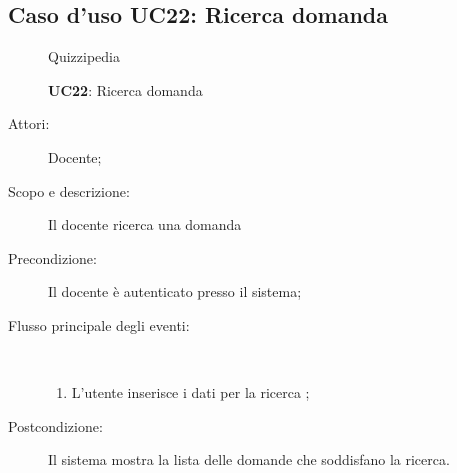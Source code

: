 \subsection{Caso d'uso UC22: Ricerca domanda}
	\begin{figure}[H]
		\centering
		\begin{resizedtikzpicture}{\textwidth}
		\begin{umlsystem}[x=0, fill=lightgray!20]{Quizzipedia}
		\end{umlsystem}
		\end{resizedtikzpicture}
		\caption{\textbf{UC22}: Ricerca domanda}
		\label{UC22}
	\end{figure}
\begin{description}
\item[Attori:] Docente;
\item[Scopo e descrizione:] Il docente ricerca una domanda
      \item[Precondizione:] Il docente è autenticato presso il sistema;

        \item[Flusso principale degli eventi:] \ 
 \begin{enumerate}
          \item L'utente inserisce i dati per la ricerca	;

      \end{enumerate}
    \item[Postcondizione:] Il sistema mostra la lista delle domande che soddisfano la ricerca.
  \end{description}
\hypertarget{UC23}{}
